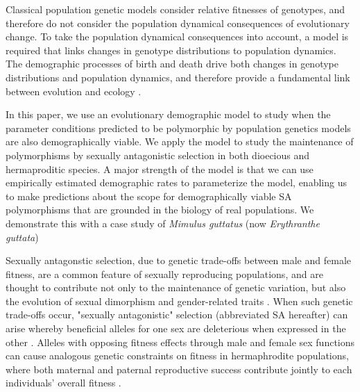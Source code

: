\documentclass[11pt]{article}
\begin{document}
Classical population genetic models consider relative fitnesses of genotypes, and therefore do not consider the population dynamical consequences of evolutionary change. To take the population dynamical consequences into account, a model is required that links changes in genotype distributions to population dynamics.  The demographic processes of birth and death drive both changes in genotype distributions and population dynamics, and therefore provide a fundamental link between evolution and ecology \citep{metcalf2007evolutionary}.  

In this paper, we use an evolutionary demographic model to study when the parameter conditions predicted to be polymorphic by population genetics models are also demographically viable. We apply the model to study the maintenance of polymorphisms by sexually antagonistic selection in both dioecious and hermaproditic species. A major strength of the model is that we can use empirically estimated demographic rates to parameterize the model, enabling us to make predictions about the scope for demographically viable SA polymorphisms that are grounded in the biology of real populations. We demonstrate this with a case study of {\itshape Mimulus guttatus} (now {\itshape Erythranthe guttata})



Sexually antagonstic selection, due to genetic trade-offs between male and female fitness, are a common feature of sexually reproducing populations, and are thought to contribute not only to the maintenance of genetic variation, but also the evolution of sexual dimorphism and gender-related traits \citep{Lande1980, Rice1992, Charlesworth1999, RiceChippindale2001, BondurianskyChenoweth2009,Olito2019}. When such genetic trade-offs occur, "sexually antagonistic" selection (abbreviated SA hereafter) can arise whereby beneficial alleles for one sex are deleterious when expressed in the other \citep{Kidwell1977, Rice1992, ConnallonClark2012}. Alleles with opposing fitness effects through male and female sex functions can cause analogous genetic constraints on fitness in hermaphrodite populations, where both maternal and paternal reproductive success contribute jointly to each individuals' overall fitness \citep{LloydWebb1986, WebbLloyd1986, Abbott2011, JordanConnallon2014}. 
\end{document}
